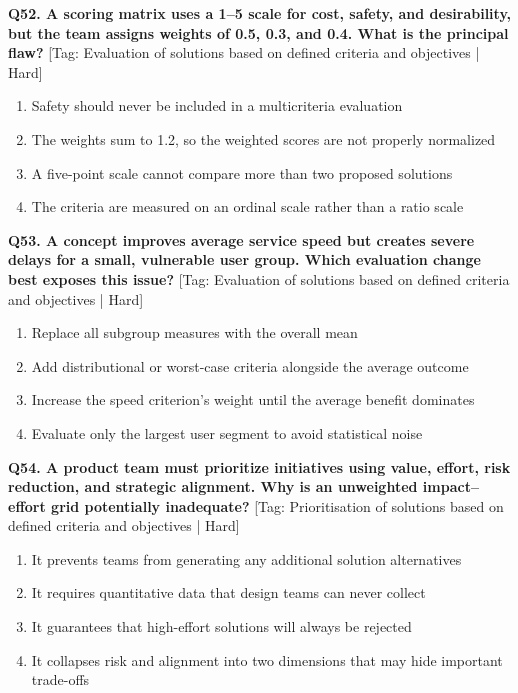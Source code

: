 \noindent\textbf{Q52. A scoring matrix uses a 1--5 scale for cost, safety, and desirability, but the team assigns weights of 0.5, 0.3, and 0.4. What is the principal flaw?} \hfill [Tag: Evaluation of solutions based on defined criteria and objectives | Hard]
\begin{enumerate}[label=(\alph*),topsep=2pt,itemsep=1pt,partopsep=0pt,parsep=0pt]
    \item {Safety should never be included in a multicriteria evaluation}
    \item {The weights sum to 1.2, so the weighted scores are not properly normalized}
    \item {A five-point scale cannot compare more than two proposed solutions}
    \item {The criteria are measured on an ordinal scale rather than a ratio scale}
\end{enumerate}
\vspace{2mm}

\noindent\textbf{Q53. A concept improves average service speed but creates severe delays for a small, vulnerable user group. Which evaluation change best exposes this issue?} \hfill [Tag: Evaluation of solutions based on defined criteria and objectives | Hard]
\begin{enumerate}[label=(\alph*),topsep=2pt,itemsep=1pt,partopsep=0pt,parsep=0pt]
    \item {Replace all subgroup measures with the overall mean}
    \item {Add distributional or worst-case criteria alongside the average outcome}
    \item {Increase the speed criterion's weight until the average benefit dominates}
    \item {Evaluate only the largest user segment to avoid statistical noise}
\end{enumerate}
\vspace{2mm}

\noindent\textbf{Q54. A product team must prioritize initiatives using value, effort, risk reduction, and strategic alignment. Why is an unweighted impact--effort grid potentially inadequate?} \hfill [Tag: Prioritisation of solutions based on defined criteria and objectives | Hard]
\begin{enumerate}[label=(\alph*),topsep=2pt,itemsep=1pt,partopsep=0pt,parsep=0pt]
    \item {It prevents teams from generating any additional solution alternatives}
    \item {It requires quantitative data that design teams can never collect}
    \item {It guarantees that high-effort solutions will always be rejected}
    \item {It collapses risk and alignment into two dimensions that may hide important trade-offs}
\end{enumerate}
\vspace{2mm}

